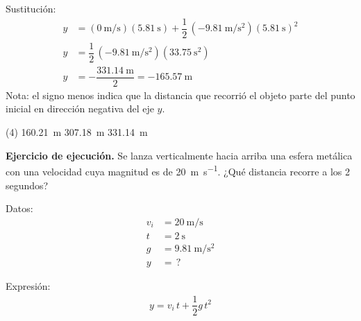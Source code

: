 \documentclass[12pt, letter]{exam}
\begin{document}
\begin{questions}
    Sustitución:
    \begin{align*}
    y &= \left( \displaystyle \SI[per-mode=fraction]{0}{\meter\per\second} \right) (\SI{5.81}{\second}) + \dfrac{1}{2} \, \left( \displaystyle -\SI[per-mode=fraction]{9.81}{\meter\per\square\second} \right) \left(\SI{5.81}{\second} \right)^{2} \\[0.5em]
    y &= \dfrac{1}{2} \, \left( \displaystyle -\SI[per-mode=fraction]{9.81}{\meter\per\square\second} \right) \left(\SI{33.75}{\square\second} \right) \\[0.5em]
    y &= - \dfrac{\SI{331.14}{\meter}}{2} = - \SI{165.57}{\meter}
    \end{align*}
    Nota: el signo menos indica que la distancia que recorrió el objeto parte del punto inicial en dirección negativa del eje $y$.
    \begin{tasks}(4)
        \task \SI{160.21}{\meter}
        \task {}
        \task \SI{307.18}{\meter}
        \task \SI{331.14}{\meter}
    \end{tasks}
    \setcounter{question}{9} \question \label{Ejercicio_06} \textbf{Ejercicio de ejecución. } Se lanza verticalmente hacia arriba una esfera metálica con una velocidad cuya magnitud es de \SI{20}{\meter\per\second}. ¿Qué distancia recorre a los \num{2} segundos?

    \begin{minipage}[t]{0.35\linewidth}
    Datos: 
    \begin{align*}
    v_{i} &= \SI{20}{\meter\per\second} \\
    t &= \SI{2}{\second} \\
    g &= \SI{9.81}{\meter\per\square\second} \\
    y &= \, ?
    \end{align*}
    \end{minipage}
    \hspace{1cm}
    \begin{minipage}[t]{0.4\linewidth}
    Expresión:
    \begin{align*}
    y = v_{i} \, t + \dfrac{1}{2} g \, t^{2}
    \end{align*}
    \end{minipage}


\end{questions}
\end{document}
